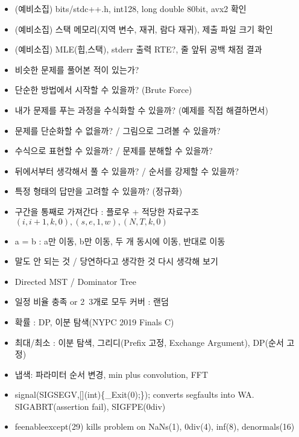 \begin{itemize}[noitemsep]
    \item (예비소집) bits/stdc++.h, int128, long double 80bit, avx2 확인
    \item (예비소집) 스택 메모리(지역 변수, 재귀, 람다 재귀), 제출 파일 크기 확인
    \item (예비소집) MLE(힙,스택), stderr 출력 RTE?, 줄 앞뒤 공백 채점 결과
    \item 비슷한 문제를 풀어본 적이 있는가?
    \item 단순한 방법에서 시작할 수 있을까? (Brute Force)
    \item 내가 문제를 푸는 과정을 수식화할 수 있을까? (예제를 직접 해결하면서)
    \item 문제를 단순화할 수 없을까? / 그림으로 그려볼 수 있을까?
    \item 수식으로 표현할 수 있을까? / 문제를 분해할 수 있을까?
    \item 뒤에서부터 생각해서 풀 수 있을까? / 순서를 강제할 수 있을까?
    \item 특정 형태의 답만을 고려할 수 있을까? (정규화)
    \item 구간을 통째로 가져간다 : 플로우 + 적당한 자료구조\\$(i,i+1,k,0),(s,e,1,w),(N,T,k,0)$
    \item a = b : a만 이동, b만 이동, 두 개 동시에 이동, 반대로 이동
    \item 말도 안 되는 것 / 당연하다고 생각한 것 다시 생각해 보기
    \item Directed MST / Dominator Tree
    \item 일정 비율 충족 or 2~3개로 모두 커버 : 랜덤
    \item 확률 : DP, 이분 탐색(NYPC 2019 Finals C)
    \item 최대/최소 : 이분 탐색, 그리디(Prefix 고정, Exchange Argument), DP(순서 고정)
    \item 냅색: 파라미터 순서 변경, min plus convolution, FFT
    \item signal(SIGSEGV,[](int)\{\_Exit(0);\}); converts segfaults into WA. SIGABRT(assertion fail), SIGFPE(0div)
    \item feenableexcept(29) kills problem on NaNs(1), 0div(4), inf(8), denormals(16)
\end{itemize}